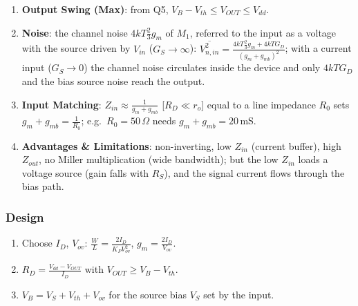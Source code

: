 \begin{enumerate}
    \paragraph{At Output:} \(V_{in} = 0\), \(G_D\) removed, \(I_{test}\) into the drain:
    \(I_d = I_{test}\), (6) gives \(V_s = \frac{I_{test}}{G_S}\); into (4):
    \begin{align*}
      I_{test} &= -(g_m + g_{mb} + g_o)\frac{I_{test}}{G_S} + g_o V_{out} \\
      g_o V_{out} &= I_{test}\left(1 + \frac{g_m + g_{mb} + g_o}{G_S}\right) \\
      Z'_{out} &= \frac{V_{out}}{I_{test}} = r_o\left(1 + (g_m + g_{mb} + g_o) R_S\right) \hspace{1cm} [\tfrac{1}{g_o} = r_o,\ \tfrac{1}{G_S} = R_S] \\
      Z'_{out} &= r_o + (g_m + g_{mb}) r_o R_S + g_o r_o R_S = r_o + R_S + (g_m + g_{mb}) r_o R_S \hspace{1cm} [g_o r_o = 1] \\
      Z_{out} &= R_D \parallel Z'_{out}
    \end{align*}
    the cascode boost: \(R_S\) below a common gate device is multiplied by \(\approx g_m r_o\).
  \item \textbf{Output Swing (Max)}: from Q5, \(V_B - V_{th} \leq V_{OUT} \leq V_{dd}\).
  \item \textbf{Noise}: the channel noise \(4kT\frac{2}{3}g_m\) of \(M_1\), referred to the input as a voltage with the
    source driven by \(V_{in}\) (\(G_S \to \infty\)): \(\overline{V_{n,in}^2} = \frac{4kT\frac{2}{3}g_m + 4kTG_D}{(g_m + g_{mb})^2}\); with a current
    input (\(G_S \to 0\)) the channel noise circulates inside the device and only \(4kTG_D\) and the bias
    source noise reach the output.
  \item \textbf{Input Matching}: \(Z_{in} \approx \frac{1}{g_m + g_{mb}}\) [\(R_D \ll r_o\)] equal to a line impedance \(R_0\)
    sets \(g_m + g_{mb} = \frac{1}{R_0}\); e.g.\ \(R_0 = 50\,\Omega\) needs \(g_m + g_{mb} = 20\,\)mS.
  \item \textbf{Advantages \& Limitations}: non-inverting, low \(Z_{in}\) (current buffer),
    high \(Z_{out}\), no Miller multiplication (wide bandwidth); but the low \(Z_{in}\) loads a
    voltage source (gain falls with \(R_S\)), and the signal current flows through the
    bias path.
\end{enumerate}

\subsubsection{Design}
\begin{enumerate}
  \item Choose \(I_D\), \(V_{ov}\): \(\frac{W}{L} = \frac{2 I_D}{K_P V_{ov}^2}\), \(g_m = \frac{2 I_D}{V_{ov}}\).
  \item \(R_D = \frac{V_{dd} - V_{OUT}}{I_D}\) with \(V_{OUT} \geq V_B - V_{th}\).
  \item \(V_B = V_S + V_{th} + V_{ov}\) for the source bias \(V_S\) set by the input.
\end{enumerate}

